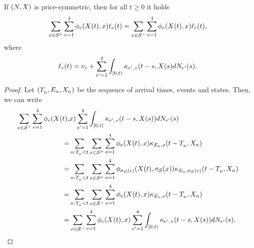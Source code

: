 \documentclass[10pt, article,table]{article}
\begin{document}
\begin{lemma}\label{lemma.price-simmetry}
 If $\sdHawkesPair$ is price-symmetric, then for all $t\geq 0$ it holds
 \begin{equation*}
  \sum_{x\in\inflationarySpace}\sum_{e=1}^{4}
  \transProb_{e}(\stateVariable(t),x)\ell_{e}(t)
  =
  \sum_{x\in\deflationarySpace}\sum_{e=1}^{4}
  \transProb_{e}(\stateVariable(t),x)\ell_{e}(t),
 \end{equation*}
where
\begin{equation*}
 \ell_{e}(t) = \baseRate_{e}
 +
 \sum_{\eone=1}^{4}\int_{[0,t)} \hawkesKernel\subscriptee(t-s,\stateVariable(s)d\countingProc[\eone](s).
\end{equation*}
\end{lemma}
\begin{proof}
 Let $(\arrivalTimes[]_n,\event[n], \stateVariable_n)$ be the sequence of arrival times, events and states. Then, we can write
 \begin{equation*}
  \begin{split}
   \sum_{x\in\inflationarySpace}\sum_{e=1}^{4}
   \transProb_{e}(\stateVariable(t),& x)
   \sum_{\eone=1}^{4}\int_{[0,t)}\hawkesKernel\subscriptee(t-s,\stateVariable(s))d\countingProc[\eone](s)
   \\
   =&
   \sum_{n:\arrivalTimes[]_n <t}
   \sum_{x\in\inflationarySpace}\sum_{e=1}^{4}
   \transProb_{e}(\stateVariable(t),x)
   \hawkesKernel_{\event[n],e}(t-\arrivalTimes[]_n,\stateVariable_n)
   \\
   =&
   \sum_{n:\arrivalTimes[]_n <t}
   \sum_{x\in\inflationarySpace}\sum_{e=1}^{4}
   \transProb_{\sigma_{E}(e)}(\stateVariable(t),\sigma_{\stateSpace}(x))
   \hawkesKernel_{\event[n],\sigma_{E}(e)}(t-\arrivalTimes[]_n,\stateVariable_n)
   \\
   =&
   \sum_{n:\arrivalTimes[]_n <t}
   \sum_{x\in\deflationarySpace}\sum_{e=1}^{4}
   \transProb_{e}(\stateVariable(t),x)
   \hawkesKernel_{\event[n],e}(t-\arrivalTimes[]_n,\stateVariable_n)
   \\   
   =&
   \sum_{x\in\deflationarySpace}\sum_{e=1}^{4}
   \transProb_{e}(\stateVariable(t), x)
   \sum_{\eone=1}^{4}\int_{[0,t)}\hawkesKernel\subscriptee(t-s,\stateVariable(s))d\countingProc[\eone](s).
   \end{split}
 \end{equation*}
\end{proof}
\end{document}
